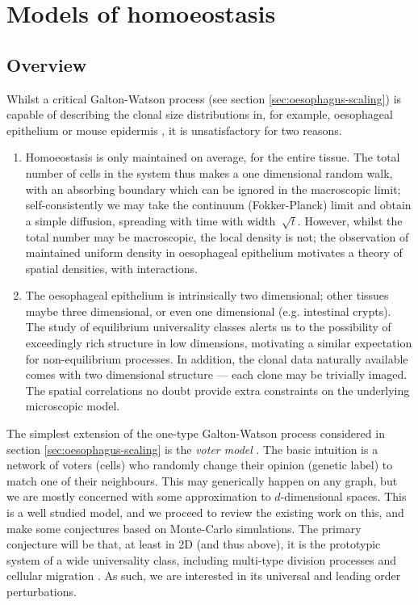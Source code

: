 \documentclass[10pt,english]{report}
\begin{document}
\chapter{Models of homoeostasis}

\section{Overview}

Whilst a critical Galton-Watson process (see section \ref{sec:oesophagus-scaling}) is capable of describing the clonal size distributions in, for example, oesophageal epithelium or mouse epidermis  \citep{klein07}, it is unsatisfactory for two reasons.

\begin{enumerate}
\item Homoeostasis is only maintained on average, for the entire tissue. The total number of cells in the system thus makes a one dimensional random walk, with an absorbing boundary which can be ignored in the macroscopic limit; self-consistently we may take the continuum (Fokker-Planck) limit and obtain a simple diffusion, spreading with time with width $~\sqrt{t}$. However, whilst the total number may be macroscopic, the local density is not; the observation of maintained uniform density in oesophageal epithelium motivates a theory of spatial densities, with interactions.

\item The oesophageal epithelium is intrinsically two dimensional; other tissues maybe three dimensional, or even one dimensional (e.g. intestinal crypts). The study of equilibrium universality classes alerts us to the possibility of exceedingly rich structure in low dimensions, motivating a similar expectation for non-equilibrium processes. In addition, the clonal data naturally available comes with two dimensional structure --- each clone may be trivially imaged. The spatial correlations no doubt provide extra constraints on the underlying microscopic model.

\end{enumerate}

The simplest extension of the one-type Galton-Watson process considered in section \ref{sec:oesophagus-scaling} is the \emph{voter model} \citep[][chapter V]{liggettbook}. The basic intuition is a network of voters (cells) who randomly change their opinion (genetic label) to match one of their neighbours. This may generically happen on any graph, but we are mostly concerned with some approximation to $d$-dimensional spaces. This is a well studied model, and we proceed to review the existing work on this, and make some conjectures based on Monte-Carlo simulations. The primary conjecture will be that, at least in 2D (and thus above), it is the prototypic system of a wide universality class, including multi-type division processes and cellular migration \citep{klein08}. As such, we are interested in its universal and leading order perturbations.
\end{document}
